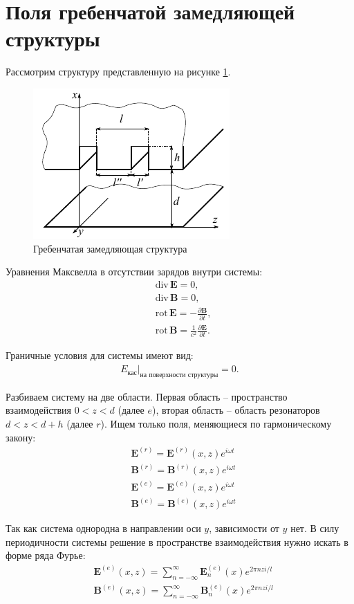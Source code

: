 \documentclass[a4paper,12pt]{extarticle} %
\newcommand{\dff}[2]{\frac{\partial #1}{\partial #2}}
\renewcommand{\vec}[1]{\bm{#1}}
\renewcommand{\div}{\mathrm{div}\,}
\newcommand{\rot}{\mathrm{rot}\,}
\begin{document}
\section{Поля гребенчатой замедляющей структуры}

Рассмотрим структуру представленную на рисунке \ref{ris1}.

\begin{figure}[ht]\label{ris1}
	\centering
	\includegraphics[width=.5\textwidth]{images/pdf/comb-type_structure.pdf}
	\caption{Гребенчатая замедляющая структура}
\end{figure}

Уравнения Максвелла в отсутствии зарядов внутри системы:
\begin{align*}
	& \div \vec{E} = 0, \\
	& \div \vec{B} = 0, \\
	& \rot \vec{E} = - \dff{\vec{B}}{t}, \\
	& \rot \vec{B} = \frac{1}{c^2}\dff{\vec{E}}{t}.
\end{align*}

Граничные условия для системы имеют вид:
\begin{align*}
	E_\text{кас}\Big|_{\text{на поверхности структуры}} = 0.
\end{align*}

Разбиваем систему на две области. Первая область -- пространство взаимодействия $0<z<d$ (далее $e$), вторая область -- область резонаторов $d<z<d+h$ (далее $r$). Ищем только поля, меняющиеся по гармоническому закону:
\begin{align*}
	& \vec{E}^{(r)} = \vec{E}^{(r)}(x, z) e^{i \omega t} \\
	& \vec{B}^{(r)} = \vec{B}^{(r)}(x, z) e^{i \omega t} \\
	& \vec{E}^{(e)} = \vec{E}^{(e)}(x, z) e^{i \omega t} \\
	& \vec{B}^{(e)} = \vec{B}^{(e)}(x, z) e^{i \omega t}
\end{align*}

Так как система однородна в направлении оси $y$, зависимости от $y$ нет. В силу периодичности системы решение в пространстве взаимодействия нужно искать в форме ряда Фурье:
\begin{align*}
& \vec{E}^{(e)}(x, z) = \sum_{n = -\infty}^{\infty} \vec{E}^{(e)}_n(x) e^{2\pi n z i /l} \\
& \vec{B}^{(e)}(x, z) = \sum_{n = -\infty}^{\infty} \vec{B}^{(e)}_n(x) e^{2\pi n z i /l}
\end{align*}
\end{document}
